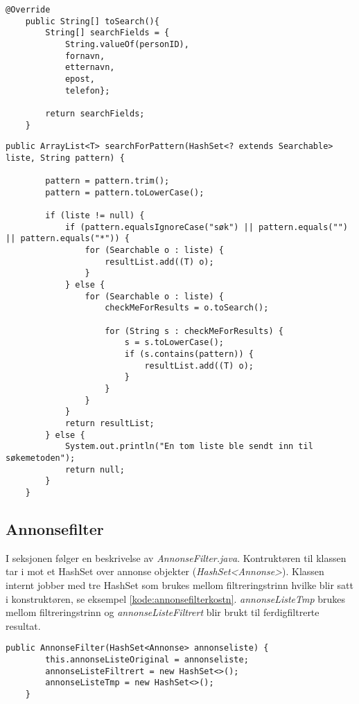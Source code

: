 \begin{lstlisting}[caption=Implemntasjon av metode \emph{toSearch() i klassen Person.java}, label=kode:mgs2]
	@Override
    public String[] toSearch(){
        String[] searchFields = {
            String.valueOf(personID), 
            fornavn, 
            etternavn, 
            epost, 
            telefon};
        
        return searchFields;
    }
\end{lstlisting}


\begin{lstlisting}[caption=Iterasjon over generisk \emph{HashSet} som implementerer interface \emph{Searchable}, label=kode:msg3]
    public ArrayList<T> searchForPattern(HashSet<? extends Searchable> liste, String pattern) {

        pattern = pattern.trim();
        pattern = pattern.toLowerCase();

        if (liste != null) {
            if (pattern.equalsIgnoreCase("søk") || pattern.equals("") || pattern.equals("*")) {
                for (Searchable o : liste) {
                    resultList.add((T) o);
                }
            } else {
                for (Searchable o : liste) {
                    checkMeForResults = o.toSearch();

                    for (String s : checkMeForResults) {
                        s = s.toLowerCase();
                        if (s.contains(pattern)) {
                            resultList.add((T) o);
                        }
                    }
                }
            }
            return resultList;
        } else {
            System.out.println("En tom liste ble sendt inn til søkemetoden");
            return null;
        }
    }
\end{lstlisting}

\subsection{Annonsefilter}
I seksjonen følger en beskrivelse av \emph{AnnonseFilter.java}. Kontruktøren til klassen tar i mot et HashSet over annonse objekter (\emph{HashSet<Annonse>}). Klassen internt jobber med tre HashSet som brukes mellom filtreringstrinn hvilke blir satt i konstruktøren, se eksempel \ref{kode:annonsefilterkostn}. \emph{annonseListeTmp} brukes mellom filtreringstrinn og \emph{annonseListeFiltrert} blir brukt til ferdigfiltrerte resultat.  

\begin{lstlisting}[caption=AnnonseFilter.java: Konstruktør, label=kode:annonsefilterkostn]
    public AnnonseFilter(HashSet<Annonse> annonseliste) {
        this.annonseListeOriginal = annonseliste;
        annonseListeFiltrert = new HashSet<>();
        annonseListeTmp = new HashSet<>();
    }
\end{lstlisting}

